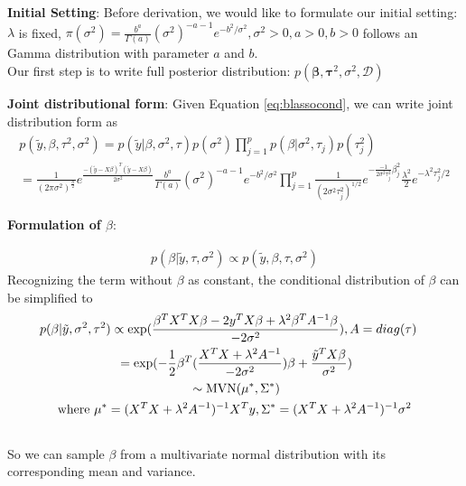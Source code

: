 \textbf{Initial Setting}:
Before derivation, we would like to formulate our initial setting: $\lambda$ is fixed, $\pi(\sigma^2) = \frac{b^a}{\Gamma(a)} (\sigma^2)^{-a-1}e^{-b^2/\sigma^2},\sigma^2>0,a>0,b>0$ follows an Gamma distribution with parameter $a$ and $b$. \\
Our first step is to write full posterior distribution: $p(\mathbf{\beta},\mathbf{\tau}^2,\sigma^{2},\mathcal{D})$

\textbf{Joint distributional form}:
Given Equation \ref{eq:blassocond}, we can write joint distribution form as
\begin{equation}
	\begin{multlined}
		p(\tilde{y},\beta,\tau^2,\sigma^2) = p(\tilde{y}|\beta,\sigma^2,\tau)p(\sigma^2)\prod_{j=1}^p p(\beta|\sigma^2,\tau_j)p(\tau_j^2)\\
		=\frac{1}{(2\pi\sigma^2)^{\frac{n}{2}}} e^{\frac{-(\tilde{y} -X\beta)^T(\tilde{y}-X\beta)}{2\sigma^2}}
		\frac{b^a}{\Gamma(a)} (\sigma^2)^{-a-1}e^{-b^2/\sigma^2}
		\prod_{j=1}^p \frac{1}{(2\sigma^2\tau_j^2)^{1/2}}e^{-\frac{-1}{2\sigma^2\tau_j^2}\beta_j^2}\frac{\lambda^2}{2}e^{-\lambda^2\tau_j^2/2}
	\end{multlined}
\end{equation}

\textbf{Formulation of $\beta$}:

\begin{equation}
	\begin{multlined}
		p(\beta | \tilde{y},\tau,\sigma^2) \propto  	p(\tilde{y},\beta,\tau,\sigma^2)
	\end{multlined}
\end{equation}
Recognizing the term without $\beta$ as constant, the conditional distribution of $\beta$ can be simplified to
\begin{equation}
	\begin{multlined}
	p(\beta|\tilde{y},\sigma^2,\tau^2) \propto \textnormal{exp}(\frac{\beta^TX^TX\beta - 2y^TX\beta +\lambda^2\beta^TA^{-1}\beta}{-2\sigma^2}), A = diag(\tau)\\
	=  \textnormal{exp}(-\frac{1}{2}\beta^T(\frac{X^TX + \lambda^2A^{-1}}{-2\sigma^2})\beta + \frac{\tilde{y}^TX\beta}{\sigma^2})\\
	\sim \textnormal{MVN}(\mu^*,\Sigma^*)\\
	\textnormal{where } \mu^* = (X^TX+\lambda^2A^{-1})^{-1}X^Ty, \Sigma^* = (X^TX+\lambda^2A^{-1})^{-1}\sigma^2\\
	\end{multlined}
\end{equation}
So we can sample $\beta$ from a multivariate normal distribution with its corresponding mean and variance.

